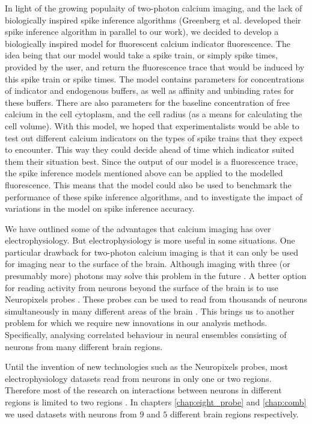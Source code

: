 In light of the growing populaity of two-photon calcium imaging, and the lack of biologically inspired spike inference algorithms (Greenberg et al. developed their spike inference algorithm in parallel to our work), we decided to develop a biologically inspired model for fluorescent calcium indicator fluorescence. The idea being that our model would take a spike train, or simply spike times, provided by the user, and return the fluorescence trace that would be induced by this spike train or spike times. The model contains parameters for concentrations of indicator and endogenous buffers, as well as affinity and unbinding rates for these buffers. There are also parameters for the baseline concentration of free calcium in the cell cytoplasm, and the cell radius (as a means for calculating the cell volume). With this model, we hoped that experimentalists would be able to test out different calcium indicators on the types of spike trains that they expect to encounter. This way they could decide ahead of time which indicator suited them their situation best. Since the output of our model is a fluorescence trace, the spike inference models mentioned above can be applied to the modelled fluorescence. This means that the model could also be used to benchmark the performance of these spike inference algorithms, and to investigate the impact of variations in the model on spike inference accuracy.

We have outlined some of the advantages that calcium imaging has over electrophysiology. But electrophysiology is more useful in some situations. One particular drawback for two-photon calcium imaging is that it can only be used for imaging near to the surface of the brain. Although imaging with three (or presumably more) photons may solve this problem in the future \parencite{ouzounov}. A better option for reading activity from neurons beyond the surface of the brain is to use Neuropixels probes \parencite{jun}. These probes can be used to read from thousands of neurons simultaneously in many different areas of the brain \parencite{allen, stringer, steinmetz, steinmetz2019}. This brings us to another problem for which we require new innovations in our analysis methods. Specifically, analysing correlated behaviour in neural ensembles consisting of neurons from many different brain regions.

Until the invention of new technologies such as the Neuropixels probes, most electrophysiology datasets read from neurons in only one or two regions. Therefore most of the research on interactions between neurons in different regions is limited to two regions \parencite{wierzynski, patterson, girard}. In chapters \ref{chap:eight_probe} and \ref{chap:comb} we used datasets with neurons from $9$ and $5$ different brain regions respectively.

